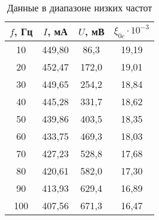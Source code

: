 \begin{table}[h!]
    \centering
    \begin{tabular}{|c|c|c|c|}
    \hline
    $f$, Гц & $I$, мА & $U$, мВ  & $\xi_{0c} \cdot 10^{-3}$ \\ \hline
    10      & 449,80  & 86,3     & 19,19                    \\ \hline
    20      & 452,47  & 172,0    & 19,01                    \\ \hline
    30      & 449,65  & 254,2    & 18,84                    \\ \hline
    40      & 445,28  & 331,7    & 18,62                    \\ \hline
    50      & 439,86  & 403,5    & 18,35                    \\ \hline
    60      & 433,75  & 469,3    & 18,03                    \\ \hline
    70      & 427,23  & 528,8    & 17,68                    \\ \hline
    80      & 420,61  & 582,0    & 17,30                    \\ \hline
    90      & 413,93  & 629,4    & 16,89                    \\ \hline
    100     & 407,56  & 671,3    & 16,47                    \\ \hline
    \end{tabular}
    \caption{Данные в диапазоне низких частот}
    \label{table_low_f}
\end{table}